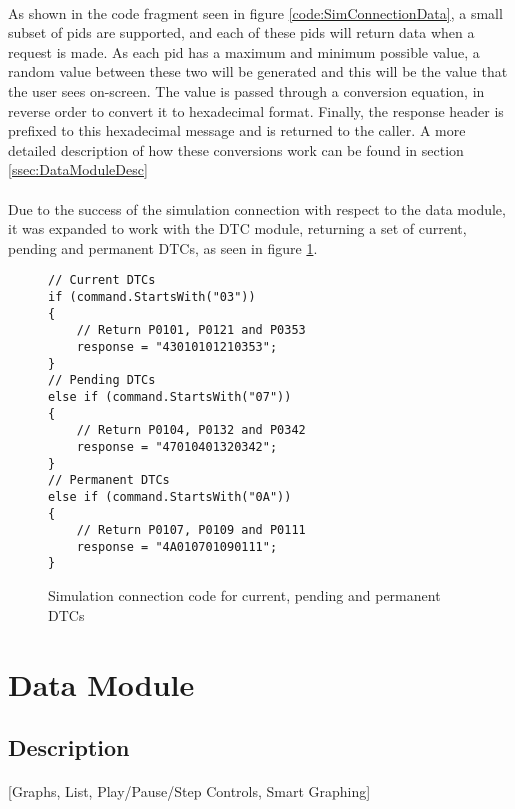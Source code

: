 		\paragraph{}{
		As shown in the code fragment seen  in figure \ref{code:SimConnectionData}, a small subset of pids are supported, and each of these pids will return data when a request is made. As each pid has a maximum and minimum possible value, a random value between these two will be generated and this will be the value that the user sees on-screen. The value  is passed through a conversion equation, in reverse order to convert it to hexadecimal format. Finally, the response header is prefixed to this hexadecimal message and is returned to the caller. A more detailed description of how these conversions work can be found in section \ref{ssec:DataModuleDesc}		
		}
		\paragraph{}{
		Due to the success of the simulation connection with respect to the data module, it was expanded to work with the DTC module, returning a set of current, pending and permanent DTCs, as seen in figure \ref{code:SimConnectionDTC}.
		}
		\begin{figure}[h]
			\begin{lstlisting}
// Current DTCs
if (command.StartsWith("03"))
{
	// Return P0101, P0121 and P0353	
	response = "43010101210353";
}
// Pending DTCs
else if (command.StartsWith("07"))
{
	// Return P0104, P0132 and P0342	
	response = "47010401320342";
}
// Permanent DTCs
else if (command.StartsWith("0A"))
{
	// Return P0107, P0109 and P0111	
	response = "4A010701090111";
}			
			\end{lstlisting}
			\caption{Simulation connection code for current, pending and permanent DTCs}
			\label{code:SimConnectionDTC}
		\end{figure}

\section{Data Module}
	\subsection{Description}{		
		\paragraph{}{
		[Graphs, List, Play/Pause/Step Controls, Smart Graphing]
		}
		\label{ssec:DataModuleDesc}
	}
